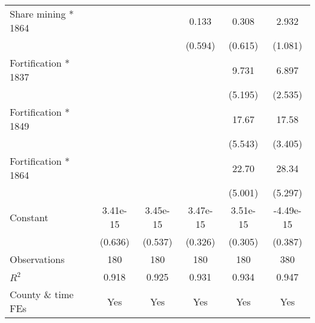 {\begin{tabular}{l*{5}{c}}
Share mining * 1864 &                     &                     &       0.133         &       0.308         &       2.932\sym{***}\\
                    &                     &                     &     (0.594)         &     (0.615)         &     (1.081)         \\
Fortification * 1837&                     &                     &                     &       9.731\sym{*}  &       6.897\sym{***}\\
                    &                     &                     &                     &     (5.195)         &     (2.535)         \\
Fortification * 1849&                     &                     &                     &       17.67\sym{***}&       17.58\sym{***}\\
                    &                     &                     &                     &     (5.543)         &     (3.405)         \\
Fortification * 1864&                     &                     &                     &       22.70\sym{***}&       28.34\sym{***}\\
                    &                     &                     &                     &     (5.001)         &     (5.297)         \\
Constant            &    3.41e-15         &    3.45e-15         &    3.47e-15         &    3.51e-15         &   -4.49e-15         \\
                    &     (0.636)         &     (0.537)         &     (0.326)         &     (0.305)         &     (0.387)         \\
\hline
Observations        &         180         &         180         &         180         &         180         &         380         \\
\(R^{2}\)           &       0.918         &       0.925         &       0.931         &       0.934         &       0.947         \\
County \& time FEs  &         Yes         &         Yes         &         Yes         &         Yes         &         Yes         \\
\hline\hline
\end{tabular}
}
